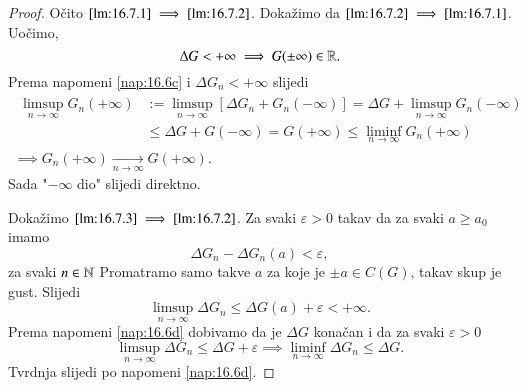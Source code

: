 \begin{proof}
    O\v cito $\ref{lm:16.7.1} \implies \ref{lm:16.7.2}$.
    Doka\v zimo da $\ref{lm:16.7.2} \implies \ref{lm:16.7.1}$.
    Uo\v cimo,
    \begin{equation*}
        \Delta G < +\infty \implies G (\pm \infty) \in \mathbb{R}.
    \end{equation*}
    Prema napomeni \ref{nap:16.6c} i $\Delta G_n < +\infty$ slijedi
    \begin{equation*}
        \begin{gathered}
            \begin{aligned}
                \limsup\limits_{n \to \infty} G_n (+\infty) &:= \limsup\limits_{n \to \infty} [ \Delta G_n + G_n (-\infty) ] = \Delta G + \limsup\limits_{n \to \infty} G_n (-\infty)\\
                &\leq \Delta G + G (-\infty) = G(+\infty) \leq \liminf\limits_{n \to \infty} G_n(+\infty) 
            \end{aligned}\\
            \implies G_n (+\infty) \xrightarrow[n \to \infty]{} G(+\infty).
        \end{gathered}
    \end{equation*}
    Sada "$-\infty$ dio" slijedi direktno.

    Doka\v zimo $\ref{lm:16.7.3} \implies \ref{lm:16.7.2}$. Za svaki $\varepsilon > 0$ takav da za svaki $a \geq a_0$ imamo
    \begin{equation*}
        \Delta G_n - \Delta G_n (a) < \varepsilon,
    \end{equation*}
    za svaki $n \in \mathbb{N}$
    Promatramo samo takve $a$ za koje je $\pm a \in C(G)$, takav skup je gust.
    Slijedi
    \begin{equation*}
        \limsup\limits_{n \to \infty} \Delta G_n \leq \Delta G (a) + \varepsilon < + \infty.
    \end{equation*}
    Prema napomeni \ref{nap:16.6d} dobivamo da je $\Delta G$ kona\v can i da za svaki $\varepsilon > 0$
    \begin{equation*}
        \limsup\limits_{n \to \infty} \Delta G_n \leq \Delta G + \varepsilon \implies \liminf\limits_{n \to \infty} \Delta G_n \leq \Delta G.
    \end{equation*}
    Tvrdnja slijedi po napomeni \ref{nap:16.6d}.


\end{proof}
